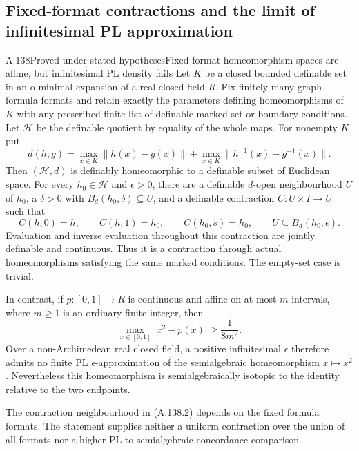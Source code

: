 \subsection{Fixed-format contractions and the limit of infinitesimal PL approximation}

\begin{saresult}{A.138}{Proved under stated hypotheses}{Fixed-format homeomorphism spaces are affine, but infinitesimal PL density fails}
Let $K$ be a closed bounded definable set in an o-minimal expansion
of a real closed field $R$. Fix finitely many graph-formula formats
and retain exactly the parameters defining homeomorphisms of $K$
with any prescribed finite list of definable marked-set or boundary
conditions. Let $\mathcal H$ be the definable quotient by equality
of the whole maps. For nonempty $K$ put
\[
 d(h,g)=\max_{x\in K}\|h(x)-g(x)\|
       +\max_{x\in K}\|h^{-1}(x)-g^{-1}(x)\|.
                                                        \tag{A.138.1}
\]
Then $(\mathcal H,d)$ is definably homeomorphic to a definable
subset of Euclidean space. For every $h_0\in\mathcal H$ and
$\epsilon>0$, there are a definable $d$-open neighbourhood $U$
of $h_0$, a $\delta>0$ with $B_d(h_0,\delta)\subseteq U$, and
a definable contraction $C:U\times I\to U$ such that
\[
 C(h,0)=h,\qquad C(h,1)=h_0,\qquad C(h_0,s)=h_0,
 \qquad U\subseteq B_d(h_0,\epsilon).                 \tag{A.138.2}
\]
Evaluation and inverse evaluation throughout this contraction are
jointly definable and continuous. Thus it is a contraction through
actual homeomorphisms satisfying the same marked conditions.
The empty-set case is trivial.

In contrast, if $p:[0,1]\to R$ is continuous and affine on at most
$m$ intervals, where $m\ge1$ is an ordinary finite integer, then
\[
 \max_{x\in[0,1]}|x^2-p(x)|\ge\frac1{8m^2}.           \tag{A.138.3}
\]
Over a non-Archimedean real closed field, a positive infinitesimal
$\epsilon$ therefore admits no finite PL $\epsilon$-approximation
of the semialgebraic homeomorphism $x\mapsto x^2$.
Nevertheless this homeomorphism is semialgebraically isotopic to
the identity relative to the two endpoints.

The contraction neighbourhood in (A.138.2) depends on the fixed
formula formats. The statement supplies neither a uniform
contraction over the union of all formats nor a higher
PL-to-semialgebraic concordance comparison.
\end{saresult}
